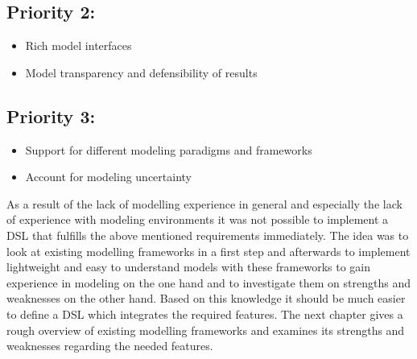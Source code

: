 \subsection*{Priority 2:}
\begin{itemize}
	\item  Rich model interfaces
	\item  Model transparency and defensibility of results
\end{itemize}
\subsection*{Priority 3:}
\begin{itemize}
	\item Support for different modeling paradigms and frameworks
	\item Account for modeling uncertainty
\end{itemize}
\par
As a result of the lack of  modelling experience in general and especially the lack of experience with modeling environments it was not possible to implement a DSL that fulfills the above mentioned requirements immediately. The idea was to look at existing modelling frameworks in a first step and afterwards to implement lightweight and easy to understand models with these frameworks to gain experience in modeling on the one hand and to investigate them on strengths and weaknesses on the other hand. Based on this knowledge it should be much easier to define a DSL which integrates the required features. The next chapter gives a rough overview of existing modelling frameworks and examines its strengths and weaknesses regarding the needed features.












